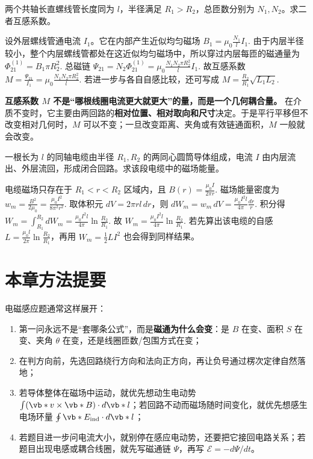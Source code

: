 \documentclass[lang=cn,11pt]{elegantbook}
\begin{document}
\begin{exercise}[共轴长直螺线管的互感]
两个共轴长直螺线管长度同为 \(l\)，半径满足 \(R_1>R_2\)，总匝数分别为 \(N_1,N_2\)。求二者互感系数。
\end{exercise}

\begin{solution}
设外层螺线管通电流 \(I_1\)。它在内部产生近似均匀磁场
 \(B_1=\mu_0\frac{N_1}{l}I_1.\) 
由于内层半径较小，整个内层螺线管都处在这近似均匀磁场中，所以穿过内层每匝的磁通量为
 \(\Phi_{21}^{(1)}=B_1\pi R_2^2.\) 
总磁链
 \(\Psi_{21}=N_2\Phi_{21}^{(1)} =\mu_0\frac{N_1N_2\pi R_2^2}{l}I_1.\) 
故互感系数
 \(\boxed{ M=\frac{\Psi_{21}}{I_1} =\mu_0\frac{N_1N_2\pi R_2^2}{l}. }\) 
若进一步与各自自感比较，还可写成
 \(M=\frac{R_2}{R_1}\sqrt{L_1L_2}.\) 
\end{solution}

\begin{remark}
\textbf{互感系数 \(M\) 不是“哪根线圈电流更大就更大”的量，而是一个几何耦合量。} 在介质不变时，它主要由两回路的\textbf{相对位置、相对取向和尺寸}决定。于是平行平移但不改变相对几何时，\(M\) 可以不变；一旦改变距离、夹角或有效链通面积，\(M\) 一般就会改变。
\end{remark}

\begin{exercise}[同轴电缆中的磁场能量]
一根长为 \(l\) 的同轴电缆由半径 \(R_1,R_2\) 的两同心圆筒导体组成，电流 \(I\) 由内层流出、外层流回，形成闭合回路。求该段电缆中的磁场能量。
\end{exercise}

\begin{solution}
电缆磁场只存在于 \(R_1<r<R_2\) 区域内，且
 \(B(r)=\frac{\mu_0I}{2\pi r}.\) 
磁场能量密度为
 \(w_m=\frac{B^2}{2\mu_0} =\frac{\mu_0I^2}{8\pi^2r^2}.\) 
取体积元 \(dV=2\pi r l\,dr\)，则
 \(dW_m=w_m\,dV =\frac{\mu_0I^2l}{4\pi}\frac{dr}{r}.\) 
积分得
 \(W_m=\int_{R_1}^{R_2}dW_m =\frac{\mu_0I^2l}{4\pi}\ln\frac{R_2}{R_1}.\) 
故
 \(\boxed{ W_m=\frac{\mu_0I^2l}{4\pi}\ln\frac{R_2}{R_1} }.\) 
若先算出该电缆的自感 \(L=\frac{\mu_0l}{2\pi}\ln\frac{R_2}{R_1}\)，再用 \(W_m=\frac12LI^2\) 也会得到同样结果。
\end{solution}

\section{本章方法提要}

电磁感应题通常这样展开：
\begin{enumerate}
 \item 第一问永远不是“套哪条公式”，而是\textbf{磁通为什么会变}：是 \(B\) 在变、面积 \(S\) 在变、夹角 \(\theta\) 在变，还是线圈匝数/包围方式在变；
 \item 在判方向前，先选回路绕行方向和法向正方向，再让负号通过楞次定律自然落地；
 \item 若导体整体在磁场中运动，就优先想动生电动势 \(\int(\vb*{v}\times\vb*{B})\cdot d\vb*{l}\)；若回路不动而磁场随时间变化，就优先想感生电场环量 \(\oint \vb*{E}_{\mathrm{ind}}\cdot d\vb*{l}\)；
 \item 若题目进一步问电流大小，就别停在感应电动势，还要把它接回电路关系；若题目出现电感或耦合线圈，就先写磁通链 \(\Psi\)，再写 \(\mathcal{E}=-d\Psi/dt\)。
\end{enumerate}
\end{document}
